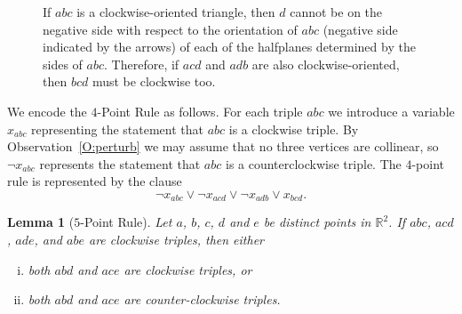 \documentclass[12pt]{amsart}
\newtheorem{lemma}[theorem]{Lemma}
\theoremstyle{remark}
\newcommand{\RR}{{\mathbb R}}
\newcommand{\be}{\begin{enumerate}}
\newcommand{\ee}{\end{enumerate}}
\begin{document}
\begin{figure}[htbp]
\begin{center}
\caption{If $abc$ is a clockwise-oriented triangle, then $d$ cannot be on the negative side with respect to the orientation of $abc$ (negative side indicated by the arrows) of each of the halfplanes determined by the sides of $abc$. Therefore, if $acd$ and $adb$ are also clockwise-oriented, then $bcd$ must be clockwise too.}
\label{fig:4ptRule}
\end{center}
\end{figure}

We encode the $4$-Point Rule as follows. %
For each triple $abc$ we introduce a variable $x_{abc}$ representing the statement that $abc$ is a clockwise triple. By Observation~\ref{O:perturb} we may assume that no three vertices
are collinear, so $\lnot x_{abc}$  represents the statement that $abc$ is a counterclockwise triple. The $4$-point rule is represented by the clause
\begin{equation}\label{Cl:4pt}  \lnot x_{abc} \lor \lnot x_{acd} \lor \lnot x_{adb} \lor  x_{bcd}.\end{equation}


\begin{lemma}[$5$-Point Rule] \label{L:5pt}
Let $a$, $b$, $c$, $d$ and $e$ be distinct points in $\RR^2$.
If $abc$, $acd$, $ade$, and $abe$ are clockwise triples,
then either
\be[(i)]
\item both $abd$ and $ace$ are clockwise triples, or
\item both $abd$ and $ace$ are counter-clockwise triples.
\ee
\end{lemma}
\end{document}
